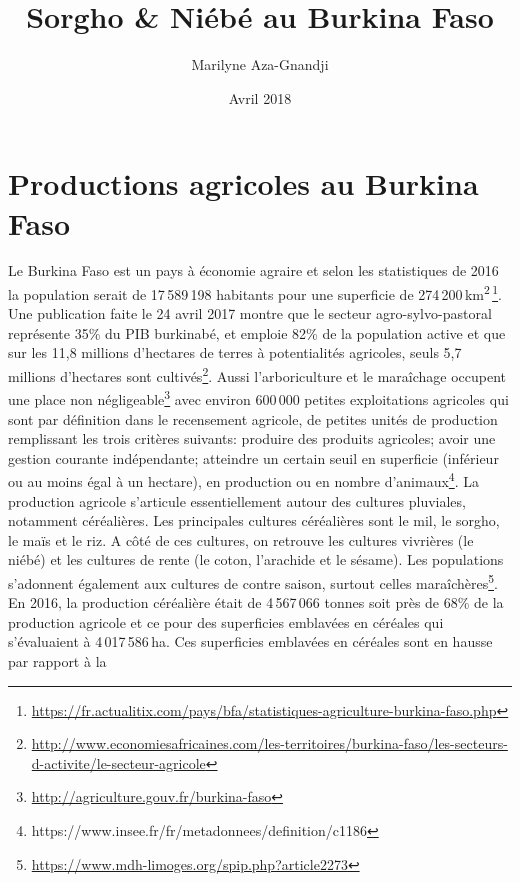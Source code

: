 \documentclass[a4paper,11pt]{article}
\begin{document}
\title{Sorgho \& Niébé au Burkina Faso}
\author{Marilyne Aza-Gnandji}
\date{Avril 2018} 

\maketitle
\tableofcontents

\section{Productions agricoles au Burkina Faso}

Le Burkina Faso est un pays à économie
agraire\cite{Koulibi_FideleZONGO} et selon les statistiques de 2016 la
population serait de 17\,589\,198 habitants pour une superficie de
274\,200\,km\textsuperscript{2}\,\footnote{\url{https://fr.actualitix.com/pays/bfa/statistiques-agriculture-burkina-faso.php}}. Une
publication faite le 24 avril 2017 montre que le secteur
agro-sylvo-pastoral représente 35\% du PIB burkinabé, et emploie 82\%
de la population active et que sur les 11,8 millions d'hectares de
terres à potentialités agricoles, seuls 5,7 millions d’hectares sont
cultivés\footnote{\url{http://www.economiesafricaines.com/les-territoires/burkina-faso/les-secteurs-d-activite/le-secteur-agricole}}. Aussi
l'arboriculture et le maraîchage occupent une place non
négligeable\footnote{\url{http://agriculture.gouv.fr/burkina-faso}}
avec environ 600\,000 petites exploitations agricoles qui sont par
définition dans le recensement agricole, de petites unités de
production remplissant les trois critères suivants: produire des
produits agricoles; avoir une gestion courante indépendante; atteindre
un certain seuil en superficie (inférieur ou au moins égal à un
hectare), en production ou en nombre
d’animaux\footnote{https://www.insee.fr/fr/metadonnees/definition/c1186}. La
production agricole s’articule essentiellement autour des cultures
pluviales, notamment céréalières. Les principales cultures céréalières
sont le mil, le sorgho, le maïs et le riz. A côté de ces cultures, on
retrouve les cultures vivrières (le niébé) et les cultures de rente
(le coton, l’arachide et le sésame). Les populations s’adonnent
également aux cultures de contre saison, surtout celles
maraîchères\footnote{\url{https://www.mdh-limoges.org/spip.php?article2273}}.
En 2016, la production céréalière était de 4\,567\,066 tonnes soit
près de 68\% de la production agricole et ce pour des superficies
emblavées en céréales qui s'évaluaient à 4\,017\,586\,ha. Ces
superficies emblavées en céréales sont en hausse par rapport à la
\end{document}
